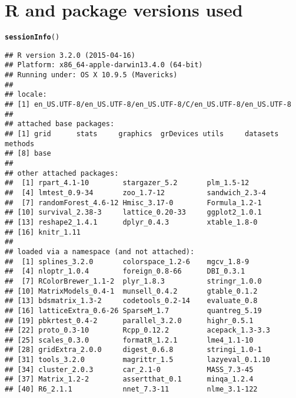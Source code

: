 \documentclass[11pt]{article}\usepackage[]{graphicx}\usepackage[]{color}
\makeatletter
\newcommand{\hlstd}[1]{\textcolor[rgb]{0.345,0.345,0.345}{#1}}%
\newcommand{\hlkwd}[1]{\textcolor[rgb]{0.737,0.353,0.396}{\textbf{#1}}}%
\newenvironment{kframe}{%
 \def\at@end@of@kframe{}%
 \ifinner\ifhmode%
  \def\at@end@of@kframe{\end{minipage}}%
  \begin{minipage}{\columnwidth}%
 \fi\fi%
 \def\FrameCommand##1{\hskip\@totalleftmargin \hskip-\fboxsep
 \colorbox{shadecolor}{##1}\hskip-\fboxsep
     \hskip-\linewidth \hskip-\@totalleftmargin \hskip\columnwidth}%
 \MakeFramed {\advance\hsize-\width
   \@totalleftmargin\z@ \linewidth\hsize
   \@setminipage}}%
 {\par\unskip\endMakeFramed%
 \at@end@of@kframe}
\newenvironment{knitrout}{}{} %
\makeatother
\begin{document}
\section{R and package versions used}
\begin{knitrout}
\color{fgcolor}\begin{kframe}
\begin{alltt}
\hlkwd{sessionInfo}\hlstd{()}
\end{alltt}
\begin{verbatim}
## R version 3.2.0 (2015-04-16)
## Platform: x86_64-apple-darwin13.4.0 (64-bit)
## Running under: OS X 10.9.5 (Mavericks)
## 
## locale:
## [1] en_US.UTF-8/en_US.UTF-8/en_US.UTF-8/C/en_US.UTF-8/en_US.UTF-8
## 
## attached base packages:
## [1] grid      stats     graphics  grDevices utils     datasets  methods  
## [8] base     
## 
## other attached packages:
##  [1] rpart_4.1-10        stargazer_5.2       plm_1.5-12         
##  [4] lmtest_0.9-34       zoo_1.7-12          sandwich_2.3-4     
##  [7] randomForest_4.6-12 Hmisc_3.17-0        Formula_1.2-1      
## [10] survival_2.38-3     lattice_0.20-33     ggplot2_1.0.1      
## [13] reshape2_1.4.1      dplyr_0.4.3         xtable_1.8-0       
## [16] knitr_1.11         
## 
## loaded via a namespace (and not attached):
##  [1] splines_3.2.0       colorspace_1.2-6    mgcv_1.8-9         
##  [4] nloptr_1.0.4        foreign_0.8-66      DBI_0.3.1          
##  [7] RColorBrewer_1.1-2  plyr_1.8.3          stringr_1.0.0      
## [10] MatrixModels_0.4-1  munsell_0.4.2       gtable_0.1.2       
## [13] bdsmatrix_1.3-2     codetools_0.2-14    evaluate_0.8       
## [16] latticeExtra_0.6-26 SparseM_1.7         quantreg_5.19      
## [19] pbkrtest_0.4-2      parallel_3.2.0      highr_0.5.1        
## [22] proto_0.3-10        Rcpp_0.12.2         acepack_1.3-3.3    
## [25] scales_0.3.0        formatR_1.2.1       lme4_1.1-10        
## [28] gridExtra_2.0.0     digest_0.6.8        stringi_1.0-1      
## [31] tools_3.2.0         magrittr_1.5        lazyeval_0.1.10    
## [34] cluster_2.0.3       car_2.1-0           MASS_7.3-45        
## [37] Matrix_1.2-2        assertthat_0.1      minqa_1.2.4        
## [40] R6_2.1.1            nnet_7.3-11         nlme_3.1-122
\end{verbatim}
\end{kframe}
\end{knitrout}
\end{document}
